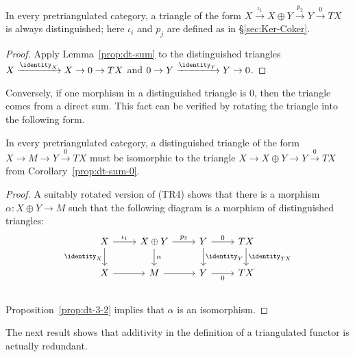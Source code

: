 \begin{corollary}\label{prop:dt-sum-0}
	In every pretriangulated category, a triangle of the form
	$X \xrightarrow{\iota_1} X \oplus Y \xrightarrow{p_2} Y
	\xrightarrow{0} TX$ is always distinguished; here $\iota_i$ and $p_j$
	are defined as in \S\ref{sec:Ker-Coker}.
\end{corollary}

\begin{proof}
	Apply Lemma~\ref{prop:dt-sum} to the distinguished triangles
	$X \xrightarrow{\identity_X} X \to 0 \to TX$ and
	$0 \to Y \xrightarrow{\identity_Y} Y \to 0$.
\end{proof}

Conversely, if one morphism in a distinguished triangle is $0$, then the
triangle comes from a direct sum. This fact can be verified by rotating the
triangle into the following form.

\begin{proposition}\label{prop:dt-sum-1}
	In every pretriangulated category, a distinguished triangle of the form
	$X \to M \to Y \xrightarrow{0} TX$ must be isomorphic to the triangle
	$X \to X \oplus Y \to Y \xrightarrow{0} TX$ from
	Corollary~\ref{prop:dt-sum-0}.
\end{proposition}

\begin{proof}
	A suitably rotated version of (TR4) shows that there is a morphism
	$\alpha: X \oplus Y \to M$ such that the following diagram is a morphism
	of distinguished triangles:
	\[\begin{tikzcd}
		X \arrow[r, "\iota_1"] \arrow[d, "\identity_X"'] & X \oplus Y \arrow[r, "p_2"] \arrow[d, "\alpha"] & Y \arrow[r, "0"] \arrow[d, "\identity_Y"] & TX \arrow[d, "\identity_{TX}"] \\
		X \arrow[r] & M  \arrow[r] & Y \arrow[r, "0"']  & TX \\
	\end{tikzcd}\]
	Proposition~\ref{prop:dt-3-2} implies that $\alpha$ is an isomorphism.
\end{proof}

The next result shows that additivity in the definition of a triangulated
functor is actually redundant.

